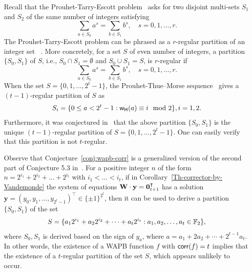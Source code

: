 \documentclass[11pt]{llncs}
\begin{document}
\begin{remark}
	Recall that the Prouhet-Tarry-Escott problem~\cite{wright_prouhets_1959}
	asks for two disjoint multi-sets $S_1$ and $S_2$ of the same number of integers
	satisfying
	\[
	\sum_{a\in S_0} a^s = 	\sum_{b\in S_1}b^s, \quad  s = 0, 1, \dots, r.
	\]
	The Prouhet-Tarry-Escott problem can be phrased as a $r$-regular partition of an integer set ~\cite{bolker_prouhettarryescott_2016}.
	More concretely, for a set $S$ of even number of integers, a partition $\{S_0,S_1\}$ of
	$S$, i.e., $S_0\cap S_1 = \emptyset$ and $S_0\cup S_1=S$, is $r$-regular  if
	\[
	\sum_{a\in S_0} a^s = 	\sum_{b\in S_1}b^s, \quad  s = 0, 1, \dots, r.
	\]
	 When the set $S=\{0,1,\dots, 2^{t}-1\}$, the Prouhet-Thue–Morse sequence~\cite{allouche_ubiquitous_1999} gives
	 a $(t-1)$-regular partition of $S$ as
	$$S_i = \{ 0\leq a<2^{t}-1: \mathsf{w_H}(a)\equiv i \mod{2}\}, i= 1,2.$$
	Furthermore, it was conjectured in~\cite[Conjecture 5.3]{bolker_prouhettarryescott_2016} that
	the above partition $\{S_0, S_1\}$ is the unique $(t-1)$-regular partition of $S=\{0,1,\dots, 2^{t}-1\}$.
	One can easily verify that this partition is not $t$-regular.

	Observe that Conjecture~\ref{conj:wapb-corr} is a generalized version of the second part of Conjecture 5.3 in~\cite{bolker_prouhettarryescott_2016}.
	For a positive integer $n$ of the form $n=2^{i_1}+2^{i_2}+\dots + 2^{i_t}$ with $i_1<\dots<i_{t}$,  if in Corollary~\ref{Th-corrector-by-Vandemonde}
	the system of equations \(	\mathbf{W} \cdot \mathbf{y} = \mathbf{0}_{{t+1}}^{\intercal}\)
	has a solution $\mathbf{y}=(y_0,y_1,\dots, y_{2^t-1})^\intercal \in \{\pm 1\}^{2^t}$, then it
	can be used to derive
	a partition $\{S_0,S_1\}$ of the set
	$$
	S= \{a_12^{i_1} + a_22^{i_2} + \cdots + a_t2^{i_t}: a_1,a_2,\dots, a_t \in \mathbb{F}_2\},
	$$
	where $S_0,S_1$ is derived based on the sign of $y_a$, where $a=a_1+2a_2+\cdots + 2^{t-1}a_t$.
	In other words, the existence of a WAPB function $f$ with $\mathsf{corr}(f)=t$ implies
	that the existence of a $t$-regular partition of the set $S$, which appears unlikely to occur.

\end{remark}



\end{document}
